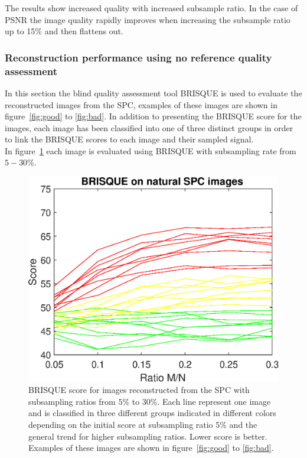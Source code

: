 The results show increased quality with increased subsample ratio. In the case of PSNR the image quality rapidly improves when increasing the subsample ratio up to 15\% and then flattens out. 



\subsubsection{Reconstruction performance using no reference quality assessment}
\label{sec:SPC_BRISQUE}
In this section the blind quality assessment tool BRISQUE is used to evaluate the reconstructed images from the SPC, examples of these images are shown in figure~\ref{fig:good} to \ref{fig:bad}. In addition to presenting the BRISQUE score for the images, each image has been classified into one of three distinct groups in order to link the BRISQUE scores to each image and their sampled signal.\\[0.1in] 

In figure~\ref{fig:brisque_plot} each image is evaluated using BRISQUE with subsampling rate from $5-30\%$.

\begin{figure}[H]
    \centering
    \includegraphics[width = 0.7\linewidth]{result/SPC_NRQA/brisque_spc.eps}
    \caption{BRISQUE score for images reconstructed from the SPC with subsampling ratios from $5\%$ to $30\%$. Each line represent one image and is classified in three different groups indicated in different colors depending on the initial score at subsampling ratio 5\% and the general trend for higher subsampling ratios. Lower score is better. Examples of these images are shown in figure~\ref{fig:good} to \ref{fig:bad}.}
    \label{fig:brisque_plot}
\end{figure}


